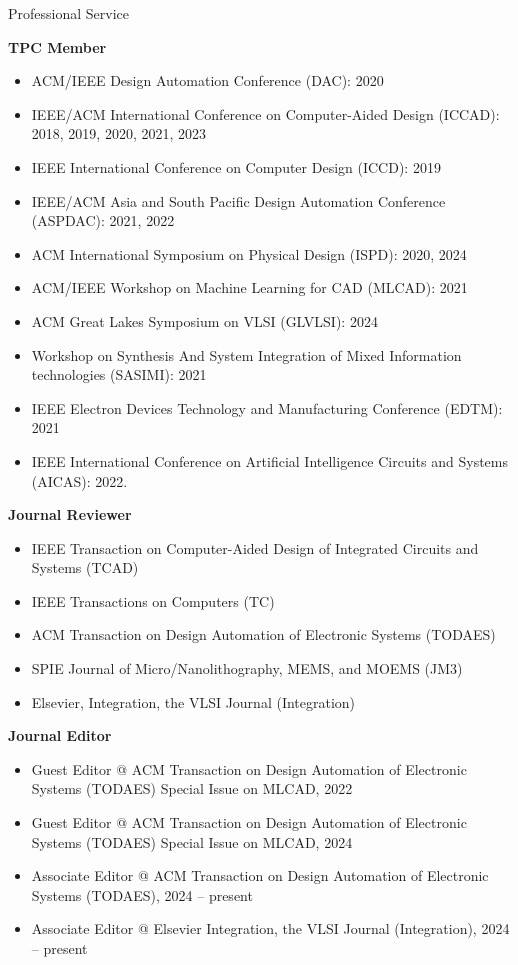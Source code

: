 
\begin{rSection}{Professional Service}

\textbf{TPC Member}
\begin{itemize}
    \item ACM/IEEE Design Automation Conference (DAC): 2020
    \item IEEE/ACM International Conference on Computer-Aided Design (ICCAD): 2018, 2019, 2020, 2021, 2023
    \item IEEE International Conference on Computer Design (ICCD): 2019
    \item IEEE/ACM Asia and South Pacific Design Automation Conference (ASPDAC): 2021, 2022
    \item ACM International Symposium on Physical Design (ISPD): 2020, 2024
    \item ACM/IEEE Workshop on Machine Learning for CAD (MLCAD): 2021
    \item ACM Great Lakes Symposium on VLSI (GLVLSI): 2024
    \item Workshop on Synthesis And System Integration of Mixed Information technologies (SASIMI): 2021
    \item IEEE Electron Devices Technology and Manufacturing Conference (EDTM): 2021
    \item IEEE International Conference on Artificial Intelligence Circuits and Systems (AICAS): 2022. 
\end{itemize}

\textbf{Journal Reviewer}
\begin{itemize}
    \item IEEE Transaction on Computer-Aided Design of Integrated Circuits and Systems (TCAD)
    \item IEEE Transactions on Computers (TC)
    \item ACM Transaction on Design Automation of Electronic Systems (TODAES)
    \item SPIE Journal of Micro/Nanolithography, MEMS, and MOEMS (JM3)
    \item Elsevier, Integration, the VLSI Journal (Integration)
\end{itemize}

\textbf{Journal Editor}
\begin{itemize}
    \item Guest Editor @ ACM Transaction on Design Automation of Electronic Systems (TODAES) Special Issue on MLCAD, 2022
    \item Guest Editor @ ACM Transaction on Design Automation of Electronic Systems (TODAES) Special Issue on MLCAD, 2024
    \item Associate Editor @ ACM Transaction on Design Automation of Electronic Systems (TODAES), 2024 -- present
    \item Associate Editor @ Elsevier Integration, the VLSI Journal (Integration), 2024 -- present
\end{itemize}


\end{rSection}
